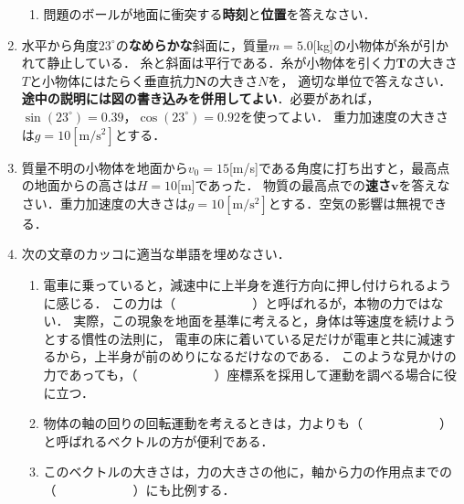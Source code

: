 \documentclass[a4paper,11pt]{ltjsarticle}
\begin{document}
\begin{enumerate}
\begin{enumerate}[label=(\arabic*),start=1]
        \item 問題のボールが地面に衝突する\textbf{時刻}と\textbf{位置}を答えなさい．
    \end{enumerate}

\clearpage

    \item 水平から角度$23^\circ$の\textbf{なめらかな}斜面に，質量$m=5.0$[kg]の小物体が糸が引かれて静止している．
    糸と斜面は平行である．糸が小物体を引く力$\bm{T}$の大きさ$T$と小物体にはたらく垂直抗力$\bm{N}$の大きさ$N$を，
    適切な単位で答えなさい．\textbf{途中の説明には図の書き込みを併用してよい}．必要があれば，$\sin(23^\circ)=0.39$，$\cos(23^\circ)=0.92$を使ってよい．
    重力加速度の大きさは$g=10[\mathrm{m/s^2}]$とする．

    \begin{center}
        \end{center}

\clearpage

    \item 質量不明の小物体を地面から$v_0=15$[m/s]である角度に打ち出すと，最高点の地面からの高さは$H=10$[m]であった．
    物質の最高点での\textbf{速さ}$\bm{v}$を答えなさい．重力加速度の大きさは$g=10[\mathrm{m/s^2}]$とする．空気の影響は無視できる．

\clearpage

    \item 次の文章のカッコに適当な単語を埋めなさい．
    
    \begin{enumerate}[label=(\arabic*)]
        \item 電車に乗っていると，減速中に上半身を進行方向に押し付けられるように感じる．
        この力は（　　　　　　）と呼ばれるが，本物の力ではない．
        実際，この現象を地面を基準に考えると，身体は等速度を続けようとする慣性の法則に，
        電車の床に着いている足だけが電車と共に減速するから，上半身が前のめりになるだけなのである．
        このような見かけの力であっても，（　　　　　　）座標系を採用して運動を調べる場合に役に立つ．
        \item 物体の軸の回りの回転運動を考えるときは，力よりも（　　　　　　）と呼ばれるベクトルの方が便利である．
        \item このベクトルの大きさは，力の大きさの他に，軸から力の作用点までの（　　　　　　）にも比例する．
    \end{enumerate}

\end{enumerate}
\end{document}
